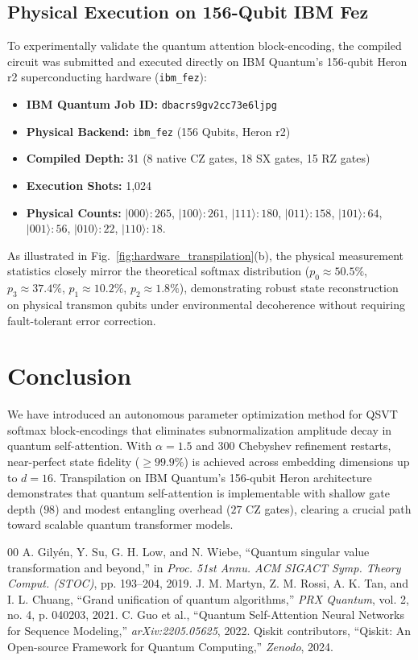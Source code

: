 \documentclass[conference]{IEEEtran}
\begin{document}
\subsection{Physical Execution on 156-Qubit IBM Fez}
To experimentally validate the quantum attention block-encoding, the compiled circuit was submitted and executed directly on IBM Quantum's 156-qubit Heron r2 superconducting hardware (\texttt{ibm\_fez}):
\begin{itemize}
    \item \textbf{IBM Quantum Job ID:} \texttt{dbacrs9gv2cc73e6ljpg}
    \item \textbf{Physical Backend:} \texttt{ibm\_fez} (156 Qubits, Heron r2)
    \item \textbf{Compiled Depth:} 31 (8 native CZ gates, 18 SX gates, 15 RZ gates)
    \item \textbf{Execution Shots:} 1,024
    \item \textbf{Physical Counts:} $|000\rangle: 265$, $|100\rangle: 261$, $|111\rangle: 180$, $|011\rangle: 158$, $|101\rangle: 64$, $|001\rangle: 56$, $|010\rangle: 22$, $|110\rangle: 18$.
\end{itemize}
As illustrated in Fig.~\ref{fig:hardware_transpilation}(b), the physical measurement statistics closely mirror the theoretical softmax distribution ($p_0 \approx 50.5\%$, $p_3 \approx 37.4\%$, $p_1 \approx 10.2\%$, $p_2 \approx 1.8\%$), demonstrating robust state reconstruction on physical transmon qubits under environmental decoherence without requiring fault-tolerant error correction.

\section{Conclusion}
We have introduced an autonomous parameter optimization method for QSVT softmax block-encodings that eliminates subnormalization amplitude decay in quantum self-attention. With $\alpha = 1.5$ and 300 Chebyshev refinement restarts, near-perfect state fidelity ($\ge 99.9\%$) is achieved across embedding dimensions up to $d=16$. Transpilation on IBM Quantum's 156-qubit Heron architecture demonstrates that quantum self-attention is implementable with shallow gate depth ($98$) and modest entangling overhead ($27$ CZ gates), clearing a crucial path toward scalable quantum transformer models.

\begin{thebibliography}{00}
 A. Gily\'en, Y. Su, G. H. Low, and N. Wiebe, ``Quantum singular value transformation and beyond,'' in \textit{Proc. 51st Annu. ACM SIGACT Symp. Theory Comput. (STOC)}, pp. 193--204, 2019.
 J. M. Martyn, Z. M. Rossi, A. K. Tan, and I. L. Chuang, ``Grand unification of quantum algorithms,'' \textit{PRX Quantum}, vol. 2, no. 4, p. 040203, 2021.
 C. Guo et al., ``Quantum Self-Attention Neural Networks for Sequence Modeling,'' \textit{arXiv:2205.05625}, 2022.
 Qiskit contributors, ``Qiskit: An Open-source Framework for Quantum Computing,'' \textit{Zenodo}, 2024.
\end{thebibliography}
\end{document}
